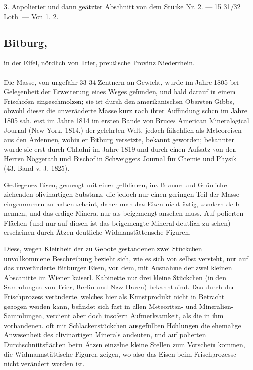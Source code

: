 \documentclass[a4paper, 11pt, oneside, polutonikogreek, german]{article}
\begin{document}
3. Anpolierter und dann geätzter Abschnitt von dem Stücke Nr. 2. — 15 31/32 Loth. — Von 1. 2.
\subsection[Bitburg.]{Bitburg,}
\begin{center}
\small
in der Eifel, nördlich von Trier, preußische Provinz Niederrhein.
\end{center}
\paragraph{}
Die Masse, von ungefähr 33-34 Zentnern an Gewicht, wurde im Jahre 1805 bei Gelegenheit der Erweiterung eines Weges gefunden, und bald darauf in einem Frischofen eingeschmolzen; sie ist durch den amerikanischen Obersten Gibbs, obwohl dieser die unveränderte Masse kurz nach ihrer Auffindung schon im Jahre 1805 sah, erst im Jahre 1814 im ersten Bande von Bruces American Mineralogical Journal (New-York. 1814.) der gelehrten Welt, jedoch fälschlich als Meteoreisen aus den Ardennen, wohin er Bitburg versetzte, bekannt geworden; bekannter wurde sie erst durch Chladni im Jahre 1819 und durch einen Aufsatz von den Herren Nöggerath und Bischof in Schweiggers Journal für Chemie und Physik (43. Band v. J. 1825).

Gediegenes Eisen, gemengt mit einer gelblichen, ins Braune und Grünliche ziehenden olivinartigen Substanz, die jedoch nur einen geringen Teil der Masse eingenommen zu haben scheint, daher man das Eisen nicht ästig, sondern derb nennen, und das erdige Mineral nur als beigemengt ansehen muss. Auf polierten Flächen (und nur auf diesen ist das beigemengte Mineral deutlich zu sehen) erscheinen durch Ätzen deutliche Widmanstättensche Figuren.

Diese, wegen Kleinheit der zu Gebote gestandenen zwei Stückchen unvollkommene Beschreibung bezieht sich, wie es sich von selbst versteht, nur auf das unveränderte Bitburger Eisen, von dem, mit Ausnahme der zwei kleinen Abschnitte im Wiener kaiserl. Kabinette nur drei kleine Stückchen (in den Sammlungen von Trier, Berlin und New-Haven) bekannt sind. Das durch den Frischprozess veränderte, welches hier als Kunstprodukt nicht in Betracht gezogen werden kann, befindet sich fast in allen Meteoriten- und Mineralien-Sammlungen, verdient aber doch insofern Aufmerksamkeit, als die in ihm vorhandenen, oft mit Schlackenstückchen ausgefüllten Höhlungen die ehemalige Anwesenheit des olivinartigen Minerals andeuten, und auf polierten Durchschnittsflächen beim Ätzen einzelne kleine Stellen zum Vorschein kommen, die Widmannstättische Figuren zeigen, wo also das Eisen beim Frischprozesse nicht verändert worden ist.
\end{document}
